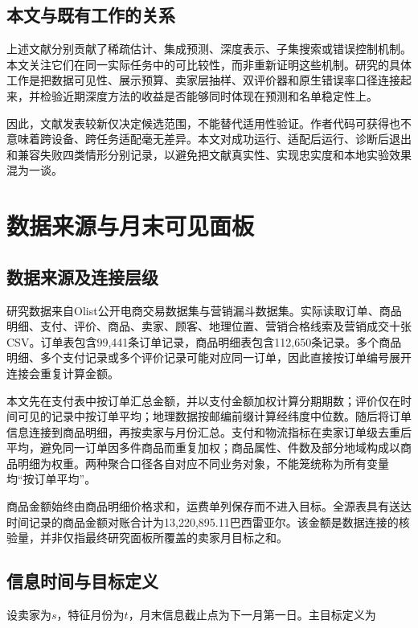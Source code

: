 \documentclass{sufethesismas}
\begin{document}
\section{本文与既有工作的关系}

上述文献分别贡献了稀疏估计、集成预测、深度表示、子集搜索或错误控制机制。本文关注它们在同一实际任务中的可比较性，而非重新证明这些机制。研究的具体工作是把数据可见性、展示预算、卖家层抽样、双评价器和原生错误率口径连接起来，并检验近期深度方法的收益是否能够同时体现在预测和名单稳定性上。

因此，文献发表较新仅决定候选范围，不能替代适用性验证。作者代码可获得也不意味着跨设备、跨任务适配毫无差异。本文对成功运行、适配后运行、诊断后退出和兼容失败四类情形分别记录，以避免把文献真实性、实现忠实度和本地实验效果混为一谈。

\chapter{数据来源与月末可见面板}

\section{数据来源及连接层级}

研究数据来自Olist公开电商交易数据集与营销漏斗数据集\cite{olist2018,funnel2018}。实际读取订单、商品明细、支付、评价、商品、卖家、顾客、地理位置、营销合格线索及营销成交十张CSV。订单表包含99,441条订单记录，商品明细表包含112,650条记录。多个商品明细、多个支付记录或多个评价记录可能对应同一订单，因此直接按订单编号展开连接会重复计算金额。

本文先在支付表中按订单汇总金额，并以支付金额加权计算分期期数；评价仅在时间可见的记录中按订单平均；地理数据按邮编前缀计算经纬度中位数。随后将订单信息连接到商品明细，再按卖家与月份汇总。支付和物流指标在卖家订单级去重后平均，避免同一订单因多件商品而重复加权；商品属性、件数及部分地域构成以商品明细为权重。两种聚合口径各自对应不同业务对象，不能笼统称为所有变量均``按订单平均''。

商品金额始终由商品明细价格求和，运费单列保存而不进入目标。全源表具有送达时间记录的商品金额对账合计为13,220,895.11巴西雷亚尔。该金额是数据连接的核验量，并非仅指最终研究面板所覆盖的卖家月目标之和。

\section{信息时间与目标定义}

设卖家为\(s\)，特征月份为\(t\)，月末信息截止点为下一月第一日。主目标定义为
\end{document}
